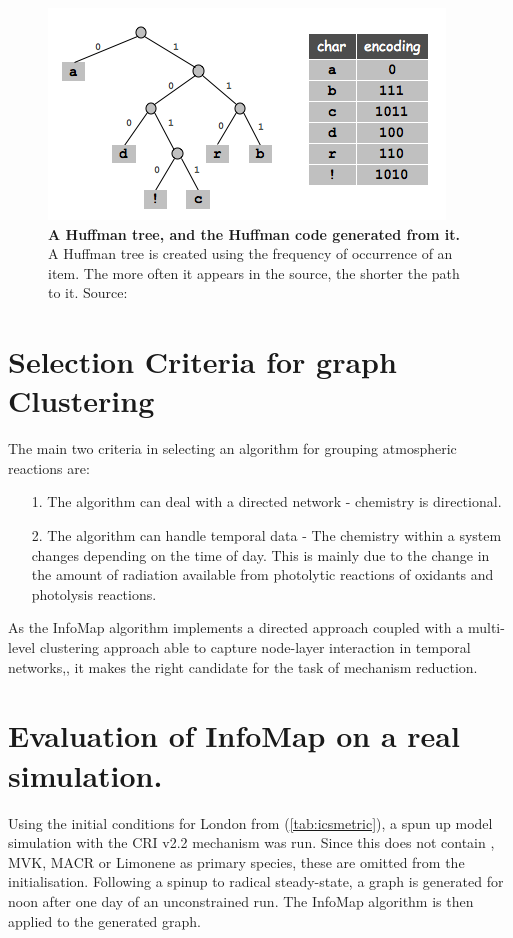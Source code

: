 \begin{figure}[H]
  \centering
  \includegraphics[width=.7\textwidth]{fig/huff.png}
  \caption{\textbf{A Huffman tree, and the Huffman code generated from it.} A Huffman tree is created using the frequency of occurrence of an item. The more often it appears in the source, the shorter the path to it.  Source:\citep{hufftree}}
    \label{fig:huff}
\end{figure}




\section{Selection Criteria for graph Clustering}

The main two criteria in selecting an algorithm for grouping atmospheric reactions are:

\begin{itemize}
    \item[1.] The algorithm can deal with a directed network - chemistry is directional.
    \item[2.] The algorithm can handle temporal data - The chemistry within a system changes depending on the time of day. This is mainly due to the change in the amount of radiation available from photolytic reactions of oxidants and photolysis reactions.
\end{itemize}

As the InfoMap algorithm implements a directed approach coupled with a multi-level clustering approach able to capture node-layer interaction in temporal networks,\citep{infointermittent}, it makes the right candidate for the task of mechanism reduction.

\section{Evaluation of InfoMap on a real simulation.}

Using the initial conditions for London from (\autoref{tab:icsmetric}), a spun up model simulation with the CRI v2.2 mechanism was run. Since this does not contain , MVK, MACR or Limonene as primary species, these are omitted from the initialisation. Following a spinup to radical steady-state, a graph is generated for noon after one day of an unconstrained run. The InfoMap algorithm is then applied to the generated graph.

